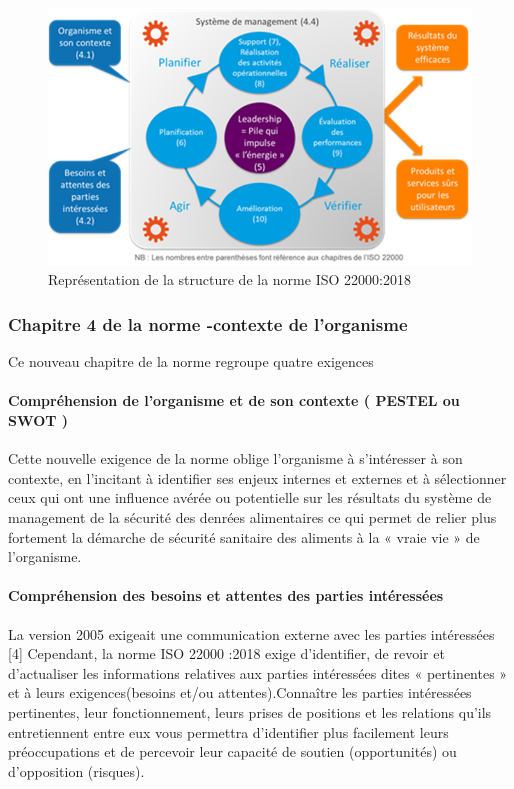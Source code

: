 \begin{spacing}{1.2}
\begin{figure}[!ht]\centering
\includegraphics[scale=0.9]{image4.png}
\caption{ Représentation de la structure de la norme ISO 22000:2018 }
\label{fig:fig1}
\end{figure}

\subsubsection{Chapitre 4 de la norme -contexte de l’organisme }
Ce nouveau chapitre de la norme regroupe quatre exigences
\paragraph{Compréhension de l’organisme et de son contexte ( PESTEL ou SWOT ) }
Cette nouvelle  exigence de la norme oblige l’organisme à s’intéresser à son contexte, en l’incitant à identifier ses enjeux internes et externes et à sélectionner ceux qui ont une influence avérée ou potentielle sur les résultats du système de management de la sécurité des denrées alimentaires  ce qui permet de relier  plus fortement la démarche de sécurité sanitaire des aliments à la « vraie vie » de l’organisme.
\paragraph{Compréhension des besoins et attentes des parties intéressées}
La  version 2005 exigeait  une communication externe avec les parties intéressées [4] Cependant, la norme ISO 22000 :2018 exige  d’identifier, de revoir et d’actualiser les informations relatives aux parties intéressées dites « pertinentes »  et à leurs exigences(besoins et/ou attentes).Connaître les parties intéressées pertinentes, leur fonctionnement, leurs prises de positions et les relations qu’ils entretiennent entre eux vous permettra d’identifier plus facilement leurs préoccupations et de percevoir leur capacité de soutien (opportunités) ou d’opposition (risques).

\end{spacing}
